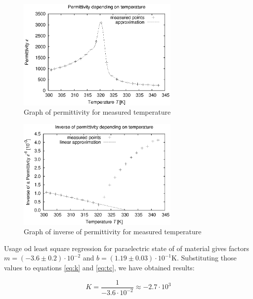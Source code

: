 \documentclass[a4paper,12pt]{article}
\begin{document}
    \begin{figure}[H]
    \begin{center}
        \includegraphics[width=0.7\textwidth]{epsilon}
        \caption{Graph of permittivity for measured temperature}
        \label{fig:epsilon}
    \end{center}
    \end{figure}

    \begin{figure}[H]
    \begin{center}
        \includegraphics[width=0.7\textwidth]{epsilon-1}
        \caption{Graph of inverse of permittivity for measured temperature}
        \label{fig:epsilon-1}
    \end{center}
    \end{figure}

    Usage od least square regression for paraelectric state of of material gives factors $m = (-3.6 \pm 0.2) \cdot 10^{-2}$ and $b = (1.19 \pm 0.03) \cdot 10^{-1} \mathrm{K}$. Substituting those values to equations \ref{eq:k} and \ref{eq:tc}, we have obtained results:

    \begin{displaymath}
        K = \frac{1}{-3.6 \cdot 10^{-2}} \approx -2.7 \cdot 10^3    
    \end{displaymath}
\end{document}
